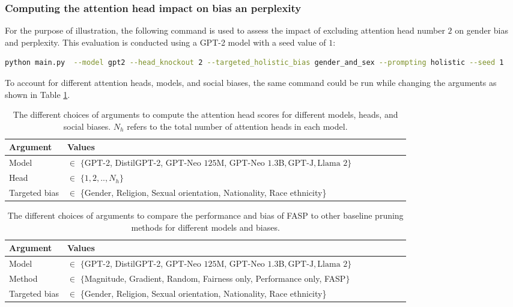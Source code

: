 \documentclass[letterpaper]{article} %
\begin{document}
\subsubsection{Computing the attention head impact on bias an perplexity}\label{sec:compute_scores}
For the purpose of illustration, the following command is used to assess the impact of excluding attention head number $2$ on gender bias and perplexity. This evaluation is conducted using a GPT-2 model with a seed value of $1$:
 \begin{lstlisting}[language=bash,numbers=none]
python main.py  --model gpt2 --head_knockout 2 --targeted_holistic_bias gender_and_sex --prompting holistic --seed 1
\end{lstlisting}
To account for different attention heads, models, and social biases, the same command could be run while changing the arguments as shown in Table \ref{tab:computing_the_score}.


\begin{table}[h!]
\centering
\begin{tabular}{llllllll}
\hline
\textbf{Argument} & \textbf{Values}\\
\hline
\centering
Model                                       & $\in$ $\{$\textrm{GPT-2}, \textrm{DistilGPT-2}, GPT-Neo $125$M, GPT-Neo $1.3$B$,\textrm{GPT-J},\textrm{Llama $2$}\}$      \\
Head                                         & $\in$ $\{1, 2, .., N_h\}$  \\
Targeted bias&  $\in$ \{Gender, Religion, Sexual orientation, Nationality, Race ethnicity\}  \\
\hline
\end{tabular}
\caption{The different choices of arguments to compute the attention head scores for different models, heads, and social biases. $N_h$ refers to the total number of attention heads in each model.
}
\label{tab:computing_the_score}
\end{table}

\begin{table}[h!]
\centering
\begin{tabular}{llllllll}
\hline
\textbf{Argument} & \textbf{Values}\\
\hline
\centering

Model                                       & $\in$ $\{$\textrm{GPT-2}, \textrm{DistilGPT-2}, GPT-Neo $125$M, GPT-Neo $1.3$B$,\textrm{GPT-J},\textrm{Llama $2$}\}$      \\
Method                                         & $\in$ $\{$Magnitude, Gradient, Random, Fairness only, Performance only, FASP$\}$  \\
Targeted bias&  $\in$ \{Gender, Religion, Sexual orientation, Nationality, Race ethnicity\}  \\
\hline
\end{tabular}
\caption{The different choices of arguments to compare the performance and bias of FASP to other baseline pruning methods for different models and biases.
}
\label{tab:baselines}
\end{table}
\end{document}
